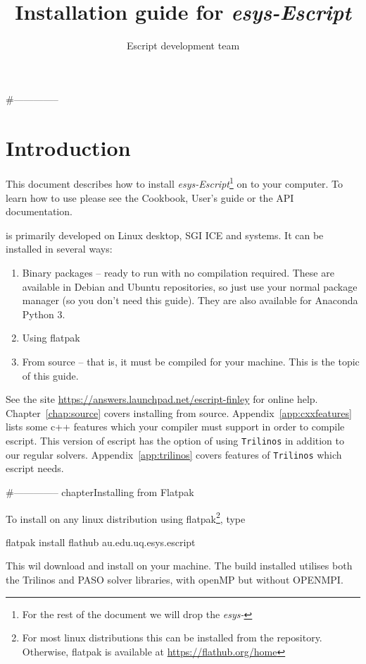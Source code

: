 \documentclass{esysdoc}
\title{Installation guide for \emph{esys-Escript}}
\author{Escript development team}
\date{\reldate}
\begin{document}
\maketitle


\cleardoublepage{}%
\tableofcontents

#--------------
\chapter{Introduction}
This document describes how to install \emph{esys-Escript}\footnote{For the rest of the document we will drop the \emph{esys-}} on to your computer.
To learn how to use \esfinley please see the Cookbook, User's guide or the API documentation.

\esfinley is primarily developed on Linux desktop, SGI ICE and \macosx systems.
It can be installed in several ways:
\begin{enumerate}
  \item Binary packages -- ready to run with no compilation required.
  These are available in Debian and Ubuntu repositories, so just use your normal package manager (so you don't need this guide). They are also available for Anaconda Python 3.
  \item Using flatpak
  \item From source -- that is, it must be compiled for your machine.
This is the topic of this guide.
\end{enumerate}

See the site \url{https://answers.launchpad.net/escript-finley} for online help.
Chapter~\ref{chap:source} covers installing from source.
Appendix~\ref{app:cxxfeatures} lists some c++ features which your compiler must support in order to compile escript.
This version of escript has the option of using \texttt{Trilinos} in addition to our regular solvers.
Appendix~\ref{app:trilinos} covers features of \texttt{Trilinos} which escript needs.

#--------------
chapter{Installing from Flatpak}\label{chap:flatpak}

To install \escript on any linux distribution using flatpak\footnote{For most linux distributions this can be installed from the repository. Otherwise, flatpak is available at \url{https://flathub.org/home}}, type
\begin{shellCode}
flatpak install flathub au.edu.uq.esys.escript
\end{shellCode}

This wil download and install \escript on your machine. The \escript build installed utilises both the Trilinos and PASO solver libraries, with openMP but without OPENMPI.
\end{document}
